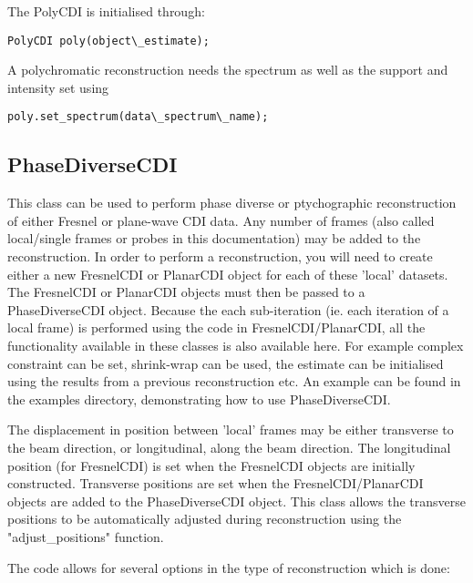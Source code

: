 \documentclass[]{nadia}
\begin{document}
The PolyCDI is initialised through:

\begin{verbatim}
PolyCDI poly(object\_estimate);
\end{verbatim}

A polychromatic reconstruction needs the spectrum as well as the support and intensity set using 
\begin{verbatim}
poly.set_spectrum(data\_spectrum\_name);
\end{verbatim}

\subsection{PhaseDiverseCDI}
This class can be used to perform phase diverse or ptychographic
reconstruction of either Fresnel or plane-wave CDI data. Any number of
frames (also called local/single frames or probes in this
documentation) may be added to the reconstruction. In order to perform
a reconstruction, you will need to create either a new FresnelCDI or
PlanarCDI object for each of these 'local' datasets. The FresnelCDI or
PlanarCDI objects must then be passed to a PhaseDiverseCDI
object. Because the each sub-iteration (ie. each iteration of a local
frame) is performed using the code in FresnelCDI/PlanarCDI, all the
functionality available in these classes is also available here. For
example complex constraint can be set, shrink-wrap can be used, the
estimate can be initialised using the results from a previous
reconstruction etc. An example can be found in the examples
directory, demonstrating how to use PhaseDiverseCDI.

The displacement in position between 'local' frames may be either
transverse to the beam direction, or longitudinal, along the beam
direction. The longitudinal position (for FresnelCDI) is set when the
FresnelCDI objects are initially constructed. Transverse positions are
set when the FresnelCDI/PlanarCDI objects are added to the
PhaseDiverseCDI object. This class allows the transverse positions to
be automatically adjusted during reconstruction using the
"adjust\_positions" function.

The code allows for several options in the type of reconstruction
which is done:
\end{document}
